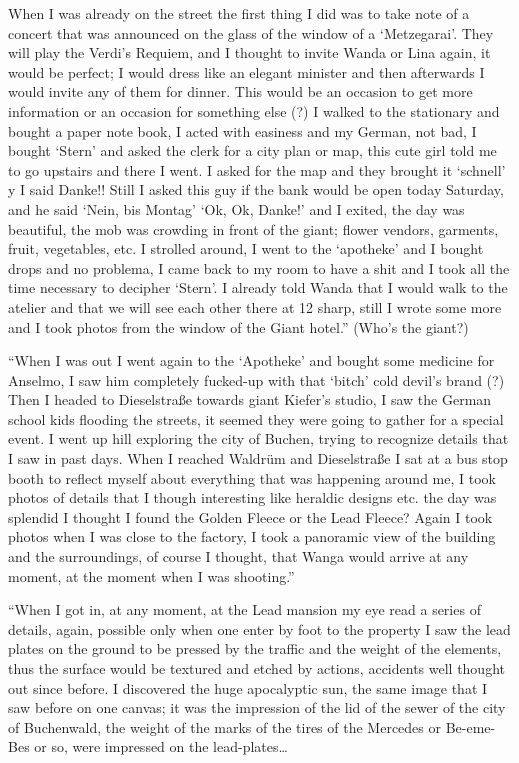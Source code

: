 \documentclass[smalldemyvopaper,11pt,twoside,onecolumn,openright,extrafontsizes]{memoir}
\newlength\drop
\begin{document}
When I was already on the street the first thing I did was to take note of a concert that was announced on the glass of the window of a ‘Metzegarai’. They will play the Verdi’s Requiem, and I thought to invite Wanda or Lina again, it would be perfect; I would dress like an elegant minister and then afterwards I would invite any of them for dinner. This would be an occasion to get more information or an occasion for something else (?) I walked to the stationary and bought a paper note book, I acted with easiness and my German, not bad, I bought ‘Stern’ and asked the clerk for a city plan or map, this cute girl told me to go upstairs and there I went. I asked for the map and they brought it ‘schnell’ y I said Danke!! Still I asked this guy if the bank would be open today Saturday, and he said ‘Nein, bis Montag’ ‘Ok, Ok, Danke!’ and I exited, the day was beautiful, the mob was crowding in front of the giant; flower vendors, garments, fruit, vegetables, etc. I strolled around, I went to the ‘apotheke’ and I bought drops and no problema, I came back to my room to have a shit and I took all the time necessary to decipher ‘Stern’. I already told Wanda that I would walk to the atelier and that we will see each other there at 12 sharp, still I wrote some more and I took photos from the window of the Giant hotel.” (Who’s the giant?)

“When I was out I went again to the ‘Apotheke’ and bought some medicine for Anselmo, I saw him completely fucked-up with that ‘bitch’ cold devil’s brand (?) Then I headed to Dieselstraße towards giant Kiefer’s studio, I saw the German school kids flooding the streets, it seemed they were going to gather for a special event. I went up hill exploring the city of Buchen, trying to recognize details that I saw in past days. When I reached Waldrüm and Dieselstraße I sat at a bus stop booth to reflect myself about everything that was happening around me, I took photos of details that I though interesting like heraldic designs etc. the day was splendid I thought I found the Golden Fleece or the Lead Fleece? Again I took photos when I was close to the factory, I took a panoramic view of the building and the surroundings, of course I thought, that Wanga would arrive at any moment, at the moment when I was shooting.”

“When I got in, at any moment, at the Lead mansion my eye read a series of details, again, possible only when one enter by foot to the property I saw the lead plates on the ground to be pressed by the traffic and the weight of the elements, thus the surface would be textured and etched by actions, accidents well thought out since before. I discovered the huge apocalyptic sun, the same image that I saw before on one canvas; it was the impression of the lid of the sewer of the city of Buchenwald, the weight of the marks of the tires of the Mercedes or Be-eme-Bes or so, were impressed on the lead-plates…
\end{document}
